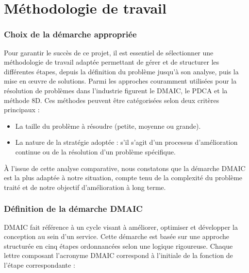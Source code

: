 \section{Méthodologie de travail}

\subsubsection{Choix de la démarche appropriée}

Pour garantir le succès de ce projet, il est essentiel de sélectionner une méthodologie de travail adaptée permettant de gérer et de structurer les différentes étapes, depuis la définition du problème jusqu'à son analyse, puis la mise en œuvre de solutions. Parmi les approches couramment utilisées pour la résolution de problèmes dans l'industrie figurent le DMAIC, le PDCA et la méthode 8D. Ces méthodes peuvent être catégorisées selon deux critères principaux :

\begin{itemize}
    \item La taille du problème à résoudre (petite, moyenne ou grande).
    \item La nature de la stratégie adoptée : s'il s'agit d'un processus d'amélioration continue ou de la résolution d'un problème spécifique.
\end{itemize}

À l'issue de cette analyse comparative, nous constatons que la démarche DMAIC est la plus adaptée à notre situation, compte tenu de la complexité du problème traité et de notre objectif d'amélioration à long terme.

\subsubsection{Définition de la démarche DMAIC}

DMAIC fait référence à un cycle visant à améliorer, optimiser et développer la conception au sein d'un service. Cette démarche est basée sur une approche structurée en cinq étapes ordonnancées selon une logique rigoureuse. Chaque lettre composant l'acronyme DMAIC correspond à l'initiale de la fonction de l'étape correspondante :

